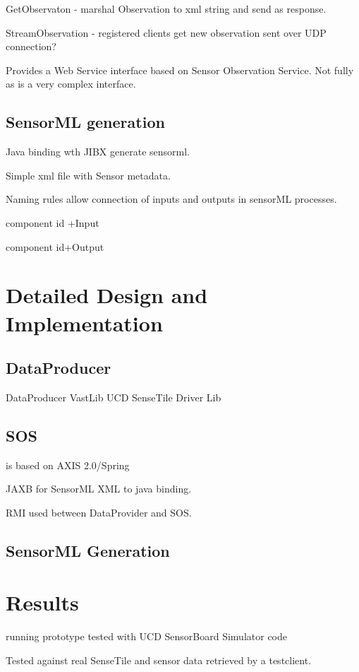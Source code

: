\documentclass[]{final_report}
\begin{document}
GetObservaton - marshal Observation to xml string and send as response.

StreamObservation -  registered clients get new observation sent over UDP connection?

Provides a Web Service interface  based on Sensor Observation Service. Not fully as is a very complex interface.

\newpage
\section{SensorML generation}

Java binding wth JIBX  generate sensorml.

Simple xml file with Sensor metadata.

Naming rules allow connection of inputs and outputs
in sensorML processes.

 component id +Input

 component id+Output

\chapter{ Detailed Design and Implementation}

\section{DataProducer}

DataProducer VastLib UCD SenseTile Driver Lib

\section{SOS}
 is based on AXIS 2.0/Spring

JAXB for SensorML XML to java binding.

RMI used between DataProvider and SOS.

\section{SensorML Generation}

\chapter{Results}

running prototype tested with UCD SensorBoard Simulator code

Tested against real SenseTile and sensor data retrieved by a testclient.
\end{document}
